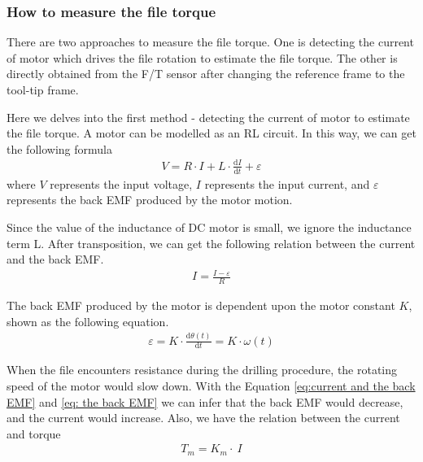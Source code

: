 \subsubsection{How to measure the file torque}
\hspace*{6mm}There are two approaches to measure the file torque. One is detecting the current of motor which drives the file rotation to estimate the file torque. The other is directly obtained from the F/T sensor after changing the reference frame to the tool-tip frame. 
\par
Here we delves into the first method - detecting the current of motor to estimate the file torque. A motor can be modelled as an RL circuit. In this way, we can get the following formula 
\begin{equation}
\begin{split}
V = R \cdot I + L  \cdot \frac{\mathrm{d}I}{\mathrm{d}t} + \varepsilon
\end{split}
\end{equation}
where $V$ represents the input voltage, $I$ represents the input current, and $\varepsilon $ represents the back EMF produced by the motor motion.
\par
Since the value of the inductance of DC motor is small, we ignore the inductance term L. After transposition, we can get the following relation between the current and the back EMF.
\begin{equation}
\label{eq:current and the back EMF}
\begin{split}
I = \frac{I - \varepsilon}{R}
\end{split}
\end{equation}
\par\noindent
The back EMF produced by the motor is dependent upon the motor constant $K$, shown as the following equation.
\begin{equation}
\label{eq: the back EMF}
\begin{split}
\varepsilon  = K \cdot \frac{\mathrm{d}\theta (t)}{\mathrm{d}t} = K \cdot \omega (t)
\end{split}
\end{equation}
\par
When the file encounters resistance during the drilling procedure, the rotating speed of the motor would slow down. With the Equation \ref{eq:current and the back EMF} and \ref{eq: the back EMF} we can infer that the back EMF would decrease, and the current would increase.
Also, we have the relation between the current and torque
\begin{equation}
\begin{split}
T_m = K_m  \cdot \ I
\end{split}
\end{equation}

